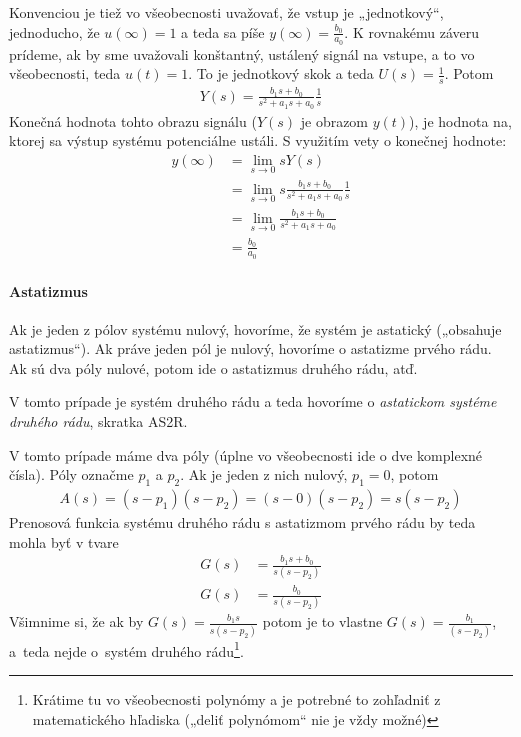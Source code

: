 \documentclass[a4paper, 10pt, ]{article}
\begin{document}
Konvenciou je tiež vo všeobecnosti uvažovať, že vstup je „jednotkový“, jednoducho, že $u(\infty) = 1$ a teda sa píše $y(\infty) = \frac{b_0 }{a_0}$. K rovnakému záveru prídeme, ak by sme uvažovali konštantný, ustálený signál na vstupe, a to vo všeobecnosti, teda $u(t) = 1$. To je jednotkový skok a teda $U(s) = \frac{1}{s}$. Potom
\begin{align}
    Y(s) = \frac{b_1 s + b_0}{s^2 + a_1 s + a_0} \frac{1}{s}
\end{align}
Konečná hodnota tohto obrazu signálu ($Y(s)$ je obrazom $y(t)$), je hodnota na, ktorej sa výstup systému potenciálne ustáli. S využitím vety o konečnej hodnote:
\begin{subequations}
    \begin{align}
        y(\infty) &= \lim_{s \to 0} s Y(s) \\
        &= \lim_{s \to 0} s \frac{b_1 s + b_0}{s^2 + a_1 s + a_0} \frac{1}{s} \\
        &= \lim_{s \to 0} \frac{b_1 s + b_0}{s^2 + a_1 s + a_0} \\
        &= \frac{b_0}{a_0}
    \end{align}
\end{subequations}


\paragraph{Astatizmus}

Ak je jeden z pólov systému nulový, hovoríme, že systém je astatický („obsahuje astatizmus“). Ak práve jeden pól je nulový, hovoríme o astatizme prvého rádu. Ak sú dva póly nulové, potom ide o astatizmus druhého rádu, atď.

V tomto prípade je systém druhého rádu a teda hovoríme o \emph{astatickom systéme druhého rádu}, skratka AS2R.

V tomto prípade máme dva póly (úplne vo všeobecnosti ide o dve komplexné čísla). Póly označme $p_1$ a $p_2$. Ak je jeden z nich nulový, $p_1 = 0$, potom
\begin{align}
    A(s) = (s - p_1)(s - p_2) = (s -0)(s - p_2) = s(s - p_2)
\end{align}
Prenosová funkcia systému druhého rádu s astatizmom prvého rádu by teda mohla byť v tvare
\begin{subequations}
    \begin{align}
        G(s) &= \frac{b_1 s + b_0}{s(s - p_2)} \\
        G(s) &= \frac{b_0}{s(s - p_2)}
    \end{align}
\end{subequations}
Všimnime si, že ak by $G(s) = \frac{b_1 s}{s(s - p_2)}$ potom je to vlastne $G(s) = \frac{b_1}{(s - p_2)}$, a~teda nejde o~systém druhého rádu\footnote{Krátime tu vo všeobecnosti polynómy a je potrebné to zohľadniť z matematického hľadiska („deliť polynómom“ nie je vždy možné)}.
\end{document}
